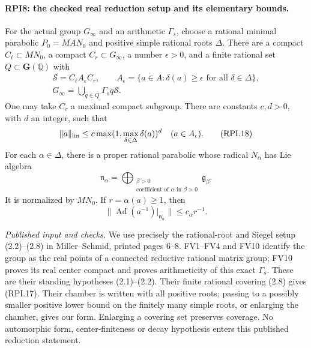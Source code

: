 \paragraph{RPI8: the checked real reduction setup and its elementary bounds.}
\label{claim:RPI8}
For the actual group \(G_\infty\) and an arithmetic
\(\Gamma_s\), choose a rational minimal parabolic
\(P_0=MAN_0\) and positive simple rational roots \(\Delta\).
There are a compact \(C_\ell\subset MN_0\), a compact
\(C_r\subset G_\infty\), a number \(\epsilon>0\), and a
finite rational set \(Q\subset\mathbf G(\mathbb Q)\) with
\[
 \begin{gathered}
 \mathcal S=C_\ell A_\epsilon C_r,\qquad
 A_\epsilon=\{a\in A:\delta(a)\ge\epsilon
                                      \text{ for all }\delta\in\Delta\},\\
 G_\infty=\bigcup_{q\in Q}\Gamma_s q\mathcal S.
 \end{gathered}
 \tag{RPI.17}
\]
One may take \(C_r\) a maximal compact subgroup.  There
are constants \(c,d>0\), with \(d\) an integer, such that
\[
       \|a\|_{\rm lin}\le
         c\max(1,\max_{\delta\in\Delta}\delta(a))^d
                                      \quad(a\in A_\epsilon).
 \tag{RPI.18}
\]
For each \(\alpha\in\Delta\), there is a proper rational
parabolic whose radical \(N_\alpha\) has Lie algebra
\[
 \mathfrak n_\alpha=
   \bigoplus_{\substack{\beta>0\\
               \text{coefficient of }\alpha\text{ in }\beta>0}}
                                      \mathfrak g_\beta.
 \tag{RPI.19}
\]
It is normalized by \(MN_0\).  If \(r=\alpha(a)\ge1\), then
\[
 \|\operatorname{Ad}(a^{-1})|_{\mathfrak n_\alpha}\|
                                      \le c_\alpha r^{-1}.
 \tag{RPI.20}
\]

\emph{Published input and checks.}
We use precisely the rational-root and Siegel setup
(2.2)--(2.8) in Miller--Schmid, printed pages 6--8.
FV1--FV4 and FV10 identify the group as the real points of a
connected reductive rational matrix group; FV10 proves its
real center compact and proves arithmeticity of this exact
\(\Gamma_s\).  These are their standing hypotheses (2.1)--(2.2).
Their finite rational covering (2.8) gives (RPI.17).
Their chamber is written with all positive roots; passing
to a possibly smaller positive lower bound on the finitely
many simple roots, or enlarging the chamber, gives our form.
Enlarging a covering set preserves coverage.  No automorphic
form, center-finiteness or decay hypothesis enters this
published reduction statement.

